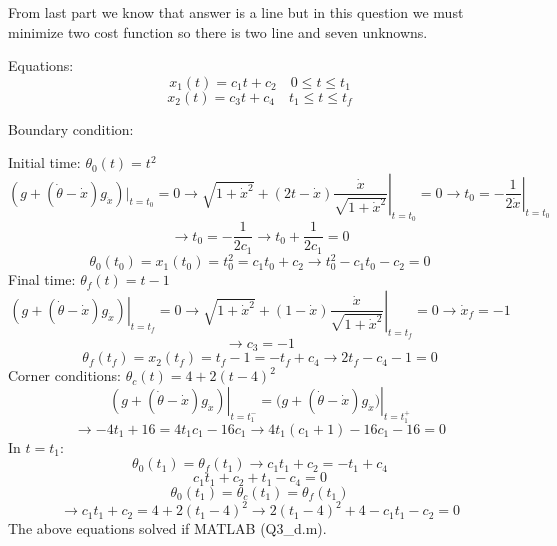 From last part we know that answer is a line but in this question we must minimize two cost function so there is two line and seven unknowns.

Equations:
$$x_1(t) = c_1t +c_2 \quad 0\leq t \leq t_1$$
$$x_2(t) = c_3t +c_4 \quad t_1 \leq t \leq t_f$$


Boundary condition:



Initial time: 
$\theta_0(t) = t^2 $
$$\left.(g + (\dot{\theta}-\dot{x})g_{\dot{x}}) \vert_{t = t_0}= 0 \to \sqrt{1+\dot{x}^2} + (2t -\dot{x} )\dfrac{\dot{x}}{\sqrt{1+\dot{x}^2}}\right\vert_{t = t_0} = 0 \to\left. t_0 = -\dfrac{1}{2\dot{x}}\right\vert_{t = t_0}$$
$$\to t_0 = -\dfrac{1}{2c_1} \to t_0 + \dfrac{1}{2c_1} = 0$$
$$\theta_0(t_0) = x_1(t_0) = t_0^2 = c_1t_0 + c_2 \to t_0^2 - c_1t_0 - c_2 = 0 $$
Final time: 
$\theta_f(t) = t-1 $
$$\left.(g + (\dot{\theta}-\dot{x})g_{\dot{x}})\right\vert_{t = t_f}  = 0 \to \sqrt{1+\dot{x}^2} + (1-\dot{x}) \left.\dfrac{\dot{x}}{\sqrt{1+\dot{x}^2}}\right\vert_{t = t_f} = 0 \to \dot{x}_f = -1$$
$$\to c_3 = -1$$
$$\theta_f(t_f) = x_2(t_f) = t_f -1 = -t_f + c_4 \to 2t_f - c_4 -1 = 0 $$
Corner conditions:
$\theta_c(t) = 4 + 2(t-4)^2$
$$\left.(g + (\dot{\theta}-\dot{x})g_{\dot{x}})\right \vert_{t = t_1^-} = (g + \left.(\dot{\theta}-\dot{x})g_{\dot{x}}) \right\vert_{t = t_1^+} $$
$$\to -4t_1 + 16 = 4t_1c_1 -16c_1 \to 4t_1(c_1+1) - 16c_1 -16 = 0$$
In $t = t_1$:
$$\theta_0(t_1) = \theta_f(t_1) \to c_1t_1+c_2 = -t_1 + c_4$$
$$c_1t_1+c_2  +t_1 - c_4 = 0$$
$$\theta_0(t_1) = \theta_c(t_1) = \theta_f(t_1)$$
$$\to c_1t_1 + c_2 = 4 + 2(t_1-4)^2 \to 2(t_1-4)^2 + 4 -c_1t_1 - c_2 = 0$$
The above equations solved if MATLAB (Q3\_d.m).



